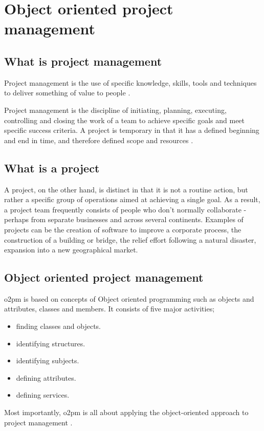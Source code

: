 \section{Object oriented project management}
\subsection{What is project management}
Project management is the use of specific knowledge, skills, tools and techniques to deliver something of value to people \cite{pmi}.

Project management is the discipline of initiating, planning, executing, controlling and closing the work of a team to achieve specific goals and meet specific success criteria. A project is temporary in that it has a defined beginning and end in time, and therefore defined scope and resources \cite{harelimana}.

\subsection{What is a project}
A project, on the other hand, is distinct in that it is not a routine action, but rather a specific group of operations aimed at achieving a single goal. As a result, a project team frequently consists of people who don't normally collaborate - perhaps from separate businesses and across several continents. Examples of projects can be the creation of software to improve a corporate process, the construction of a building or bridge, the relief effort following a natural disaster, expansion into a new geographical market.

\subsection{Object oriented project management}
\ac{o2pm} is based on concepts of Object oriented programming such as objects and attributes, classes and members. It consists of five major activities;

\begin{itemize}
\item finding classes and objects.
\item identifying structures.
\item identifying subjects.
\item defining attributes.
\item defining services.
\end{itemize}

Most importantly, \ac{o2pm} is all about applying the object-oriented approach to project management \cite{chandrashekar}.

